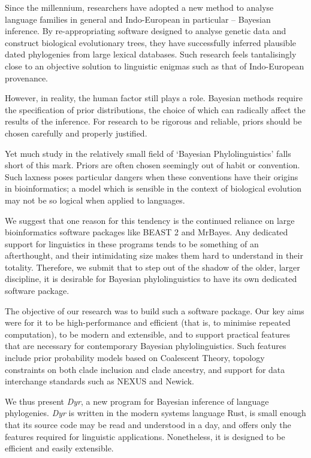 \documentclass[10pt,journal,compsoc]{IEEEtran}
\begin{document}
Since the millennium, researchers have adopted a new method to analyse language families in general and Indo-European in particular -- Bayesian inference. By re-appropriating software designed to analyse genetic data and construct biological evolutionary trees, they have successfully inferred plausible dated phylogenies from large lexical databases\cite{greenhill2020bayesian}. Such research feels tantalisingly close to an objective solution to linguistic enigmas such as that of Indo-European provenance.

However, in reality, the human factor still plays a role. Bayesian methods require the specification of prior distributions, the choice of which can radically affect the results of the inference. For research to be rigorous and reliable, priors should be chosen carefully and properly justified.

Yet much study in the relatively small field of `Bayesian Phylolinguistics' falls short of this mark. Priors are often chosen seemingly out of habit or convention. Such laxness poses particular dangers when these conventions have their origins in bioinformatics; a model which is sensible in the context of biological evolution may not be so logical when applied to languages.

We suggest that one reason for this tendency is the continued reliance on large bioinformatics software packages like BEAST 2\cite{bouckaert2014beast} and MrBayes\cite{ronquist2012mrbayes}. Any dedicated support for linguistics in these programs tends to be something of an afterthought, and their intimidating size makes them hard to understand in their totality. Therefore, we submit that to step out of the shadow of the older, larger discipline, it is desirable for Bayesian phylolinguistics to have its own dedicated software package.

The objective of our research was to build such a software package. Our key aims were for it to be high-performance and efficient (that is, to minimise repeated computation), to be modern and extensible, and to support practical features that are necessary for contemporary Bayesian phylolinguistics. Such features include prior probability models based on Coalescent Theory, topology constraints on both clade inclusion and clade ancestry, and support for data interchange standards such as NEXUS and Newick.

We thus present \textit{Dyr}, a new program for Bayesian inference of language phylogenies. \textit{Dyr} is written in the modern systems language Rust, is small enough that its source code may be read and understood in a day, and offers only the features required for linguistic applications. Nonetheless, it is designed to be efficient and easily extensible. 
\end{document}
